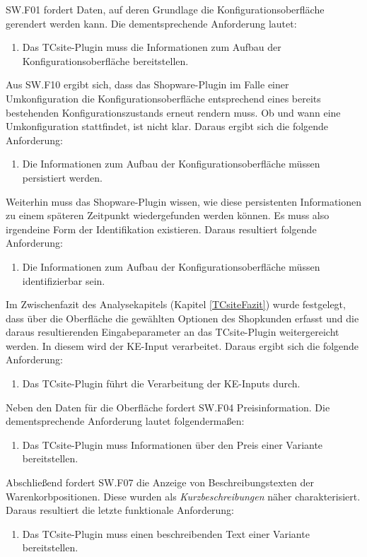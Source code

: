 \documentclass[11pt, a4paper, titlepage, listof=totoc, bibliography=totoc, index=totoc, twoside, openright, headings=normal]{scrreprt}
\begin{document}
SW.F01 fordert Daten, auf deren Grundlage die Konfigurationsoberfläche gerendert werden kann. Die dementsprechende Anforderung lautet:
\begin{enumerate}[TC.F01:]\bfseries
\item Das TCsite-Plugin muss die Informationen zum Aufbau der Konfigurationsoberfläche bereitstellen.
\end{enumerate}
Aus SW.F10 ergibt sich, dass das Shopware-Plugin im Falle einer Umkonfiguration die Konfigurationsoberfläche entsprechend eines bereits bestehenden Konfigurationszustands erneut rendern muss. Ob und wann eine Umkonfiguration stattfindet, ist nicht klar. Daraus ergibt sich die folgende Anforderung:
\begin{enumerate}[TC.F02:]\bfseries
\item Die Informationen zum Aufbau der Konfigurationsoberfläche müssen persistiert werden.
\end{enumerate}
Weiterhin muss das Shopware-Plugin wissen, wie diese persistenten Informationen zu einem späteren Zeitpunkt wiedergefunden werden können. Es muss also irgendeine Form der Identifikation existieren. Daraus resultiert folgende Anforderung:
\begin{enumerate}[TC.F03:]\bfseries
\item Die Informationen zum Aufbau der Konfigurationsoberfläche müssen identifizierbar sein.
\end{enumerate}
Im Zwischenfazit des Analysekapitels (Kapitel \ref{TCsiteFazit}) wurde festgelegt, dass über die Oberfläche die gewählten Optionen des Shopkunden erfasst und die daraus resultierenden Eingabeparameter an das TCsite-Plugin weitergereicht werden. In diesem wird der KE-Input verarbeitet. Daraus ergibt sich die folgende Anforderung:
\begin{enumerate}[TC.F04:]\bfseries
\item Das TCsite-Plugin führt die Verarbeitung der KE-Inputs durch.
\end{enumerate}
Neben den Daten für die Oberfläche fordert SW.F04 Preisinformation. Die dementsprechende Anforderung lautet folgendermaßen:
\begin{enumerate}[TC.F05:]\bfseries
\item Das TCsite-Plugin muss Informationen über den Preis einer Variante bereitstellen.
\end{enumerate}
Abschließend fordert SW.F07 die Anzeige von Beschreibungstexten der Warenkorbpositionen. Diese wurden als \emph{Kurzbeschreibungen} näher charakterisiert. Daraus resultiert die letzte funktionale Anforderung:
\begin{enumerate}[TC.F06:]\bfseries
\item Das TCsite-Plugin muss einen beschreibenden Text einer Variante bereitstellen.
\end{enumerate}
\end{document}
